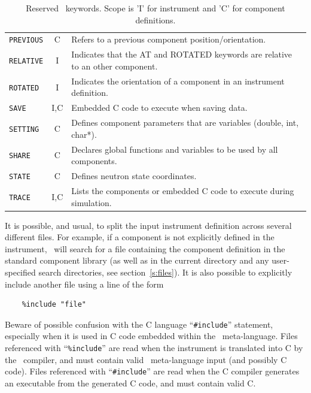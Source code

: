 \begin{table}
\begin{center}
{\begin{tabular}{|l|c|p{}|}
      \texttt{PREVIOUS} & C & Refers to a previous component position/orientation.\\
      \texttt{RELATIVE} & I & Indicates that the AT and ROTATED keywords are relative to an other component. \\
      \texttt{ROTATED} & I & Indicates the orientation of a component in an instrument definition. \\
      \texttt{SAVE} & I,C & Embedded C code to execute when saving data. \\
      \texttt{SETTING} & C & Defines component parameters that are
      variables (double, int, char*). \\
      \texttt{SHARE} & C & Declares global functions and variables to be used by all components. \\
      \texttt{STATE} & C & Defines neutron state coordinates. \\
      \texttt{TRACE} & I,C & Lists the components or embedded C code to execute during simulation. \\
      \hline
    \end{tabular}
    \caption{Reserved \MCS\ keywords.
    Scope is 'I' for instrument and 'C' for component definitions.}
    \label{t:keywords}
    }
  \end{center}
\end{table}

It is possible, and usual, to split the input instrument definition
across several different files. For example, if a component is not
explicitly defined in the instrument,
\MCS\ will search for a file containing the component definition in the
standard component library (as well as in the current directory and any
user-specified search directories, see section~\ref{s:files}). It is
also possible to explicitly include another file using a line of the
form 
\begin{verbatim}
    %include "file"
\end{verbatim}
Beware of possible confusion with the C language ``\verb+#include+''
statement, especially when it is used in C code embedded within the
\MCS\ meta-language. Files referenced with ``\verb+%include+'' are read
when the instrument is translated into C by the \MCS\ compiler, and must
contain valid \MCS\ meta-language input (and possibly C code). Files referenced with
``\verb+#include+'' are read when the C compiler generates an
executable from the generated C code, and must contain valid C.

